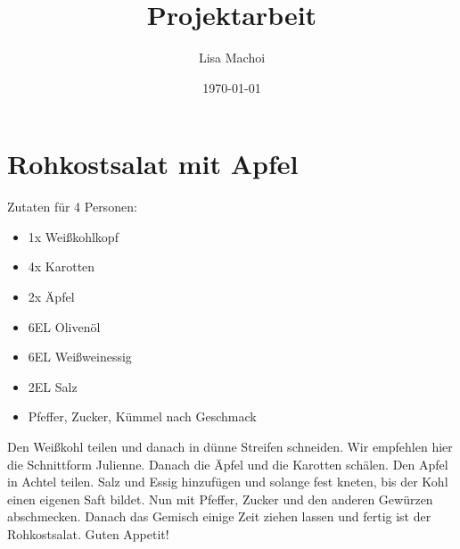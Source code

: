 \documentclass[10pt,a4paper,oneside]{article}
\begin{document}
\thispagestyle{empty}
\title{Projektarbeit}
\author{Lisa Machoi}
\date{\today}
\maketitle
\newpage
\tableofcontents
\setcounter{page}{0}
\newpage
\setcounter{page}{1}
\section{Rohkostsalat mit Apfel}
Zutaten für 4 Personen:
\begin{itemize}
	\item 1x Weißkohlkopf
	\item 4x Karotten
	\item 2x Äpfel
	\item 6EL Olivenöl
	\item 6EL Weißweinessig
	\item 2EL Salz
	\item Pfeffer, Zucker, Kümmel nach Geschmack
\end{itemize}
Den Weißkohl teilen und danach in dünne Streifen schneiden.
Wir empfehlen hier die Schnittform Julienne.
Danach die Äpfel und die Karotten schälen.
Den Apfel in Achtel teilen.
Salz und Essig hinzufügen und solange fest kneten, bis der Kohl einen eigenen Saft bildet.
Nun mit Pfeffer, Zucker und den anderen Gewürzen abschmecken.
Danach das Gemisch einige Zeit ziehen lassen und fertig ist der Rohkostsalat.
Guten Appetit!
\end{document}
